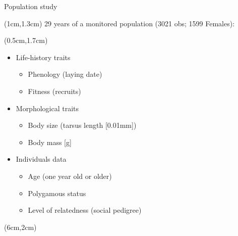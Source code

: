 \documentclass[compress]{beamer}
\begin{document}
\begin{frame}{Population study}\vspace{10pt}

\begin{textblock*}{10cm}(1cm,1.3cm)
29 years of a monitored population (3021 obs; 1599 Females):
%  
\end{textblock*}

\begin{textblock*}{9cm}(0.5cm,1.7cm)
\begin{itemize}
\item<2->Life-history traits
\begin{itemize}
\item Phenology (laying date)
\item Fitness (recruits)
\end{itemize}

\item<3-> Morphological traits 
\begin{itemize}
\item Body size (tarsus length [0.01mm])
\item Body mass [g] 
\end{itemize}

\item <4->Individuals data 
\begin{itemize}
\item Age (one year old or older)
\item Polygamous status
\item Level of relatedness (social pedigree)
\end{itemize}
\end{itemize}
\end{textblock*}

\begin{textblock*}{6cm}(6cm,2cm)
\end{textblock*}


\end{frame}
\end{document}
